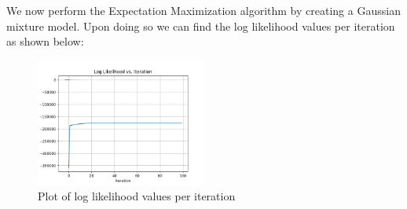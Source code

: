 \documentclass{article}
\begin{document}
We now perform the Expectation Maximization algorithm by creating a Gaussian mixture model. Upon doing so we can find the log likelihood values per iteration as shown below:

\begin{figure}[h]
    \centering
    \includegraphics[width=0.5\textwidth]{plot_log_likelihood.png}
    \caption{Plot of log likelihood values per iteration}
\end{figure}
\end{document}
